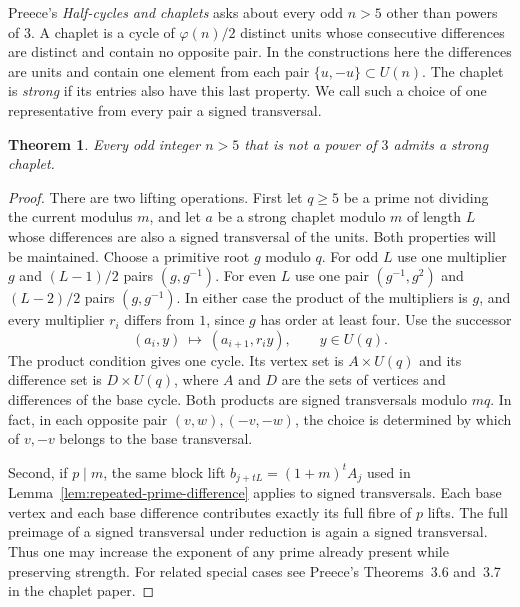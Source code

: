 \documentclass[11pt,a4paper]{article}
\newtheorem{theorem}{Theorem}[section]
\newcommand{\U}{U}
\begin{document}
Preece's \emph{Half-cycles and chaplets} \cite[Section~10, p.~279]{chaplet} asks about every odd $n>5$ other than powers of $3$. A chaplet is a cycle of $\varphi(n)/2$ distinct units whose consecutive differences are distinct and contain no opposite pair. In the constructions here the differences are units and contain one element from each pair $\{u,-u\}\subset\U(n)$. The chaplet is \emph{strong} if its entries also have this last property. We call such a choice of one representative from every pair a signed transversal.

\begin{theorem}\label{thm:chaplet}
Every odd integer $n>5$ that is not a power of $3$ admits a strong chaplet.
\end{theorem}

\begin{proof}
There are two lifting operations. First let $q\ge5$ be a prime not dividing the current modulus $m$, and let $a$ be a strong chaplet modulo $m$ of length $L$ whose differences are also a signed transversal of the units. Both properties will be maintained. Choose a primitive root $g$ modulo $q$. For odd $L$ use one multiplier $g$ and $(L-1)/2$ pairs $(g,g^{-1})$. For even $L$ use one pair $(g^{-1},g^2)$ and $(L-2)/2$ pairs $(g,g^{-1})$. In either case the product of the multipliers is $g$, and every multiplier $r_i$ differs from $1$, since $g$ has order at least four. Use the successor
\[
             (a_i,y)\ \longmapsto\ (a_{i+1},r_i y),
             \qquad y\in\U(q).
\]
The product condition gives one cycle. Its vertex set is $A\times\U(q)$ and its difference set is $D\times\U(q)$, where $A$ and $D$ are the sets of vertices and differences of the base cycle. Both products are signed transversals modulo $mq$. In fact, in each opposite pair $(v,w),(-v,-w)$, the choice is determined by which of $v,-v$ belongs to the base transversal.

Second, if $p\mid m$, the same block lift $b_{j+tL}=(1+m)^t A_j$ used in Lemma~\ref{lem:repeated-prime-difference} applies to signed transversals. Each base vertex and each base difference contributes exactly its full fibre of $p$ lifts. The full preimage of a signed transversal under reduction is again a signed transversal. Thus one may increase the exponent of any prime already present while preserving strength. For related special cases see Preece's Theorems~3.6 and~3.7 in the chaplet paper.


\end{proof}
\end{document}
